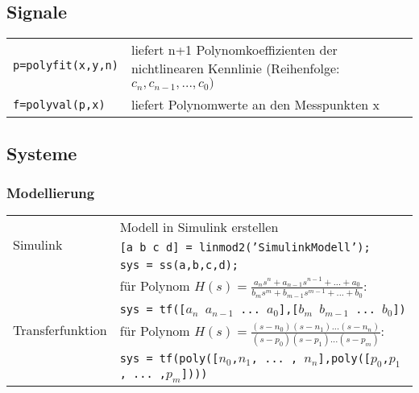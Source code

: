 \subsection{Signale}

\begin{tabular}{ll}
	\texttt{p=polyfit(x,y,n)} & liefert n+1 Polynomkoeffizienten der nichtlinearen Kennlinie (Reihenfolge: $c_n, c_{n-1}, ..., c_0)$ \\
	\texttt{f=polyval(p,x)} & liefert Polynomwerte an den Messpunkten x \\
\end{tabular}


\subsection{Systeme}

\subsubsection{Modellierung}
\begin{tabular}{|l|l|}  \hline
	\multirow{3}{*}{Simulink}
		 	& Modell in Simulink erstellen \\
			& \texttt{[a b c d] = linmod2('SimulinkModell');} \\
			& \texttt{sys = ss(a,b,c,d);} \\ \hline
	\multirow{4}{*}{Transferfunktion}
			& für Polynom $H(s) = \frac{a_n s^n + a_{n-1} s^{n-1} + ... + a_0}{b_m s^m + b_{m-1} s^{m-1} + ... + b_0}$: \\
			& \texttt{sys = tf([$a_n$ $a_{n-1}$ ... $a_0$],[$b_m$ $b_{m-1}$ ... $b_0$])} \\ \cline{2-2}
			& für Polynom $H(s) = \frac{(s-n_0) (s-n_1) ... (s-n_n)}{(s-p_0) (s-p_1) ... (s-p_m)}$: \\
			& \texttt{sys = tf(poly([$n_0$,$n_1$, ... , $n_n$],poly([$p_0$,$p_1$, ... ,$p_m$])))}	\\ \hline
\end{tabular} 

